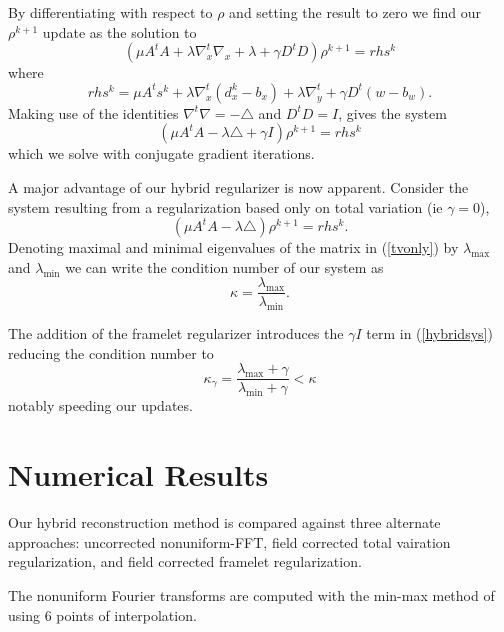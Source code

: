 \documentclass[12pt]{amsart}
\theoremstyle{remark}
\begin{document}
By differentiating with respect to $\rho$ and setting the result to zero we find our $\rho^{k+1}$ update as the solution to
\begin{equation}
(\mu A^tA + \lambda \nabla_x^t \nabla_x + \lambda + \gamma D^tD )\rho^{k+1} = rhs^k
\end{equation}
where
\begin{equation}
rhs^k = \mu A^t s^k + \lambda \nabla_x ^t (d_x^k - b_x) + \lambda \nabla_y^t + \gamma D^t(w - b_w).
\end{equation}
Making use of the identities $\nabla^t \nabla = - \triangle$ and $D^tD = I$, gives the system
\begin{equation}\label{hybridsys}
(\mu A^tA - \lambda \triangle + \gamma I )\rho^{k+1} = rhs^k
\end{equation}
which we solve with conjugate gradient iterations.

A major advantage of our hybrid regularizer is now apparent. Consider the system resulting from a regularization based only on total variation (ie $\gamma =0$),
\begin{equation}\label{tvonly}
(\mu A^tA - \lambda \triangle)\rho^{k+1} = rhs^k.
\end{equation}
Denoting maximal and minimal eigenvalues of the matrix in (\ref{tvonly}) by $\lambda_{\max}$ and $\lambda_{\min}$ we can write the condition number of our system as
\begin{equation}
\kappa = \frac{\lambda_{\max}}{\lambda_{\min}}.
\end{equation}

The addition of the framelet regularizer introduces the $\gamma I$ term in (\ref{hybridsys}) reducing the condition number to
\begin{equation}
\kappa_\gamma  =  \frac{\lambda_{\max} + \gamma}{\lambda_{\min} + \gamma} < \kappa
\end{equation}
notably speeding our updates.

\section{Numerical Results}

Our hybrid reconstruction method is compared against three alternate approaches: uncorrected nonuniform-FFT, field corrected total vairation regularization, and field corrected framelet regularization.

The nonuniform Fourier transforms are computed with the min-max method of \cite{Fessler2003} using $6$ points of interpolation. 
\end{document}
